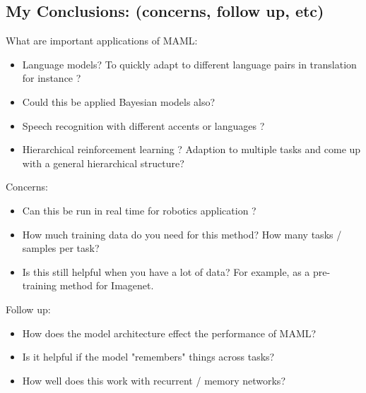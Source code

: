 \subsection{My Conclusions: (concerns, follow up, etc)}

What are important applications of MAML:
\begin{itemize}
    \item Language models? To quickly adapt to different language pairs in translation for instance ?
    \item Could this be applied Bayesian models also?
    \item Speech recognition with different accents or languages ?
    \item Hierarchical reinforcement learning ? Adaption to multiple tasks and come up with a general
          hierarchical structure?
\end{itemize}

Concerns:
\begin{itemize}
    \item Can this be run in real time for robotics application ?
    \item How much training data do you need for this method? How many tasks / samples per task?
    \item Is this still helpful when you have a lot of data? For example, as a pre-training method for Imagenet.
\end{itemize}

Follow up:
\begin{itemize}
    \item How does the model architecture effect the performance of MAML?
    \item Is it helpful if the model "remembers" things across tasks?
    \item How well does this work with recurrent / memory networks?
\end{itemize}
